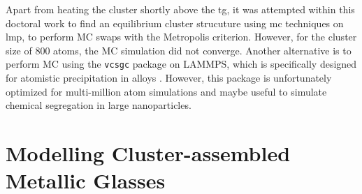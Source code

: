 Apart from heating the cluster shortly above the \gls{tg}, it was attempted within this doctoral work to find an equilibrium cluster strucuture using \gls{mc} techniques on \gls{lmp}, to perform MC swaps with the Metropolis criterion. However, for the cluster size of 800 atoms, the MC simulation did not converge. Another alternative is to perform MC using the \texttt{vcsgc} package on LAMMPS, which is specifically designed for atomistic precipitation in alloys \cite{Sadigh2012}. However, this package is unfortunately optimized for multi-million atom simulations and maybe useful to simulate chemical segregation in large nanoparticles. \par

\section{Modelling Cluster-assembled Metallic Glasses} \label{s:camgdev}
%
